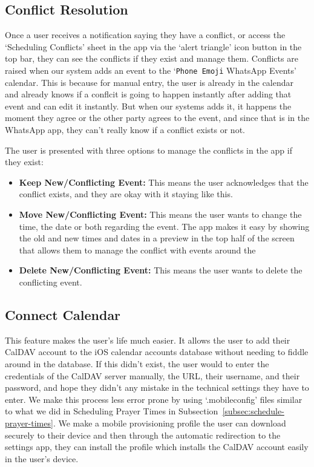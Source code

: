 \subsection{Conflict Resolution}
\label{subsec:conflict-resolution}

Once a user receives a notification saying they have a conflict, or access the `Scheduling Conflicts' sheet in the app via the `alert triangle' icon button in the top bar, they can see the conflicts if they exist and manage them. Conflicts are raised when our system adds an event to the `\texttt{Phone Emoji} WhatsApp Events' calendar. This is because for manual entry, the user is already in the calendar and already knows if a conflcit is going to happen instantly after adding that event and can edit it instantly. But when our systems adds it, it happens the moment they agree or the other party agrees to the event, and since that is in the WhatsApp app, they can't really know if a conflict exists or not.

The user is presented with three options to manage the conflicts in the app if they exist:
\begin{itemize}
    \item \textbf{Keep New/Conflicting Event:} This means the user acknowledges that the conflict exists, and they are okay with it staying like this.
    \item \textbf{Move New/Conflicting Event:} This means the user wants to change the time, the date or both regarding the event. The app makes it easy by showing the old and new times and dates in a preview in the top half of the screen that allows them to manage the conflict with events around the 
    \item \textbf{Delete New/Conflicting Event:} This means the user wants to delete the conflicting event.
\end{itemize}

\subsection{Connect Calendar}
\label{subsec:connect-calendar}

This feature makes the user's life much easier. It allows the user to add their CalDAV account to the iOS calendar accounts database without needing to fiddle around in the database. If this didn't exist, the user would to enter the credentials of the CalDAV server manually, the URL, their username, and their password, and hope they didn't any mistake in the technical settings they have to enter. We make this process less error prone by using `.mobileconfig' files similar to what we did in Scheduling Prayer Times in Subsection~\ref{subsec:schedule-prayer-times}. We make a mobile provisioning profile the user can download securely to their device and then through the automatic redirection to the settings app, they can install the profile which installs the CalDAV account easily in the user's device.


